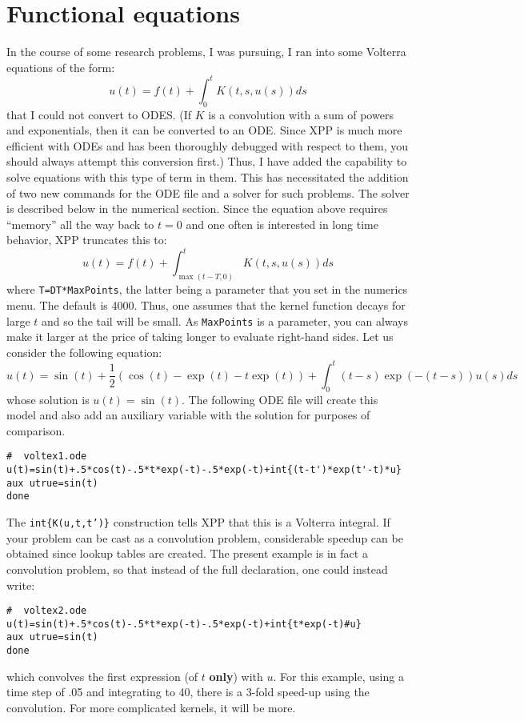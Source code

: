 \documentclass{article}
\begin{document}
\section{Functional equations}
In the course of some research problems, I was pursuing, I ran into
some Volterra equations of the form:
\[
	u(t)=f(t)+\int_0^t K(t,s,u(s))ds
\]
that I could not convert to ODES.  (If $K$ is a convolution with a
sum of powers and
exponentials, then it can be converted to an ODE.  Since XPP is much
more efficient with ODEs and has been thoroughly debugged with respect
to them, you should always attempt this conversion first.)  Thus, I
have added the capability to solve equations with this type of term in
them.  This has necessitated the addition of two new commands for the
ODE file and a solver for such problems. The solver is
described below in the numerical section.  Since the equation above
requires ``memory'' all the way back to $t=0$ and one often is
interested in long time behavior, XPP truncates this to:
\[
	u(t)=f(t)+\int_{\max(t-T,0)}^t K(t,s,u(s))ds
\]
where {\tt T=DT*MaxPoints}, the latter being a parameter that you
set in the numerics menu.  The default is 4000.  Thus, one
assumes that the kernel function decays for large $t$ and so the tail
will be small.  As {\tt MaxPoints} is a parameter, you can always make
it larger at the price of taking longer to evaluate right-hand sides.
Let us consider
the following equation:
\[
 u(t) = \sin(t)+\frac{1}{2}(\cos(t)-\exp(t)-t\exp(t))+\int_0^t
(t-s)\exp(-(t-s))u(s)ds
\]
whose solution is $u(t)=\sin(t).$  The following ODE file will create
this model and also add an auxiliary variable with the solution for
purposes of comparison.
\begin{verbatim}
#  voltex1.ode
u(t)=sin(t)+.5*cos(t)-.5*t*exp(-t)-.5*exp(-t)+int{(t-t')*exp(t'-t)*u}
aux utrue=sin(t)
done
\end{verbatim}
The {\tt int\{K(u,t,t')\}} construction tells XPP that this is a
Volterra integral. If your problem can be
cast as a convolution problem, considerable speedup can be obtained
since lookup tables are created.  The present example is
in fact a convolution problem, so that instead of the full
declaration, one could instead write:
\begin{verbatim}
#  voltex2.ode
u(t)=sin(t)+.5*cos(t)-.5*t*exp(-t)-.5*exp(-t)+int{t*exp(-t)#u}
aux utrue=sin(t)
done
\end{verbatim}
which convolves the first expression (of $t$ {\bf only}) with $u.$ For
this example, using a time step of .05 and integrating to 40, there is
a 3-fold speed-up using the convolution.  For more complicated
kernels, it will be more.
\end{document}
